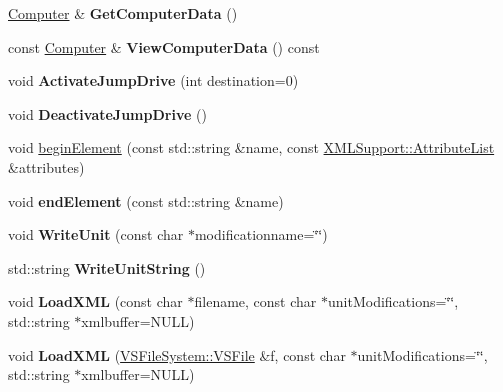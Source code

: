 \begin{DoxyCompactItemize}
\item 
\hyperlink{classUnit_1_1Computer}{Computer} \& {\bfseries Get\+Computer\+Data} ()\hypertarget{classUnit_ae2952d62ec7684bcc25bcc1b5bb12c7b}{}\label{classUnit_ae2952d62ec7684bcc25bcc1b5bb12c7b}

\item 
const \hyperlink{classUnit_1_1Computer}{Computer} \& {\bfseries View\+Computer\+Data} () const \hypertarget{classUnit_abde33ad56dc58213710435279c558d39}{}\label{classUnit_abde33ad56dc58213710435279c558d39}

\item 
void {\bfseries Activate\+Jump\+Drive} (int destination=0)\hypertarget{classUnit_a60260ac6aadcfcd60900694fa498ac84}{}\label{classUnit_a60260ac6aadcfcd60900694fa498ac84}

\item 
void {\bfseries Deactivate\+Jump\+Drive} ()\hypertarget{classUnit_a7d8842c225213e42f30557a5728e9480}{}\label{classUnit_a7d8842c225213e42f30557a5728e9480}

\item 
void \hyperlink{classUnit_ac9f334be84ef29709a7b4abf2080915c}{begin\+Element} (const std\+::string \&name, const \hyperlink{classXMLSupport_1_1AttributeList}{X\+M\+L\+Support\+::\+Attribute\+List} \&attributes)
\item 
void {\bfseries end\+Element} (const std\+::string \&name)\hypertarget{classUnit_adb9b597ec10df5776b31a657e81b9141}{}\label{classUnit_adb9b597ec10df5776b31a657e81b9141}

\item 
void {\bfseries Write\+Unit} (const char $\ast$modificationname=\char`\"{}\char`\"{})\hypertarget{classUnit_a08b67c748953996d0b366cd388720599}{}\label{classUnit_a08b67c748953996d0b366cd388720599}

\item 
std\+::string {\bfseries Write\+Unit\+String} ()\hypertarget{classUnit_ae98c894c44d77696d4c0a94ff86f8b52}{}\label{classUnit_ae98c894c44d77696d4c0a94ff86f8b52}

\item 
void {\bfseries Load\+X\+ML} (const char $\ast$filename, const char $\ast$unit\+Modifications=\char`\"{}\char`\"{}, std\+::string $\ast$xmlbuffer=N\+U\+LL)\hypertarget{classUnit_a7523a82e2272a2889b82485b5d432dd1}{}\label{classUnit_a7523a82e2272a2889b82485b5d432dd1}

\item 
void {\bfseries Load\+X\+ML} (\hyperlink{classVSFileSystem_1_1VSFile}{V\+S\+File\+System\+::\+V\+S\+File} \&f, const char $\ast$unit\+Modifications=\char`\"{}\char`\"{}, std\+::string $\ast$xmlbuffer=N\+U\+LL)\hypertarget{classUnit_a1a1cd8465b1d10ccaeefd5a54eedc2de}{}\label{classUnit_a1a1cd8465b1d10ccaeefd5a54eedc2de}


\end{DoxyCompactItemize}
